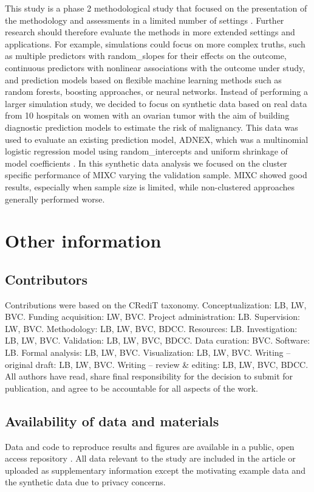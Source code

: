 This study is a phase 2 methodological study that focused on the presentation of the methodology and assessments in a limited number of settings \cite{heinzePhasesMethodologicalResearch2024}. Further research should therefore evaluate the methods in more extended settings and applications. For example, simulations could focus on more complex truths, such as multiple predictors with \glspl{random_slope} for their effects on the outcome, continuous predictors with nonlinear associations with the outcome under study, and prediction models based on flexible machine learning methods such as random forests, boosting approaches, or neural networks. Instead of performing a larger simulation study, we decided to focus on synthetic data based on real data from 10 hospitals on women with an ovarian tumor with the aim of building diagnostic prediction models to estimate the risk of malignancy. This data was used to evaluate an existing prediction model, \gls{ADNEX}, which was a multinomial logistic regression model using \glspl{random_intercept} and uniform shrinkage of model coefficients \cite{vancalsterEvaluatingRiskOvarian2014}. In this synthetic data analysis we focused on the cluster specific performance of \gls{MIXC} varying the validation sample. \gls{MIXC} showed good results, especially when sample size is limited, while non-clustered approaches generally performed worse.

\section*{Other information}
\subsection*{Contributors}
Contributions were based on the CRediT taxonomy. Conceptualization: LB, LW, BVC. Funding acquisition: LW, BVC. Project administration: LB. Supervision: LW, BVC. Methodology: LB, LW, BVC, BDCC. Resources: LB. Investigation: LB, LW, BVC. Validation: LB, LW, BVC, BDCC. Data curation: BVC. Software: LB. Formal analysis: LB, LW, BVC. Visualization: LB, LW, BVC. Writing -- original draft: LB, LW, BVC. Writing -- review \& editing: LB, LW, BVC, BDCC. All authors have read, share final responsibility for the decision to submit for publication, and agree to be accountable for all aspects of the work.

\subsection*{Availability of data and materials}
Data and code to reproduce results and figures are available in a public, open access repository \cite{barrenadaOSFClusteredFlexible2024}. All data relevant to the study are included in the article or uploaded as supplementary information except the motivating example data and the synthetic data due to privacy concerns.

